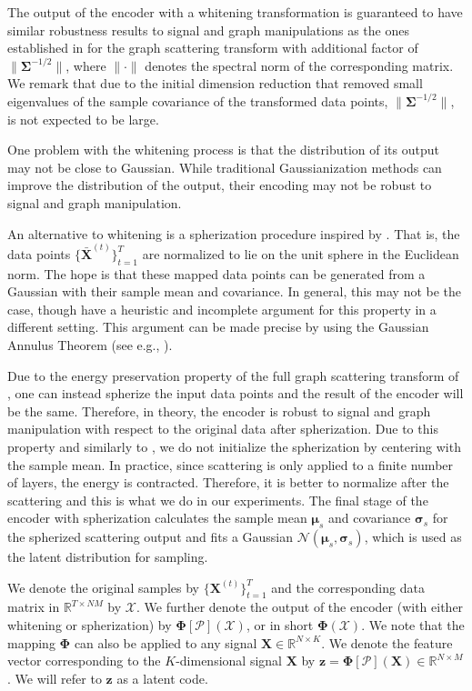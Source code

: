 \documentclass[conference]{IEEEtran}
\def\RR{\mathbb{R}}
\def\cN{\mathcal{N}}
\def\cP{\mathcal{P}}
\def\BX{\boldsymbol{X}}
\def\Bz{\boldsymbol{z}}
\def\BPhi{\boldsymbol{\Phi}}
\def\Bmu{\boldsymbol{\mu}}
\def\Bsigma{\boldsymbol{\sigma}}
\def\BSigma{\boldsymbol{\Sigma}}
\begin{document}
The output of the encoder with a whitening transformation is guaranteed to have similar robustness results to signal and graph manipulations as the ones established in \cite{zou2018graph} for the graph scattering transform with additional factor of $\|\BSigma^{-1/2}\|$, where $\|\cdot\|$ denotes the spectral norm of the corresponding matrix. We remark that due to the initial dimension reduction that removed small eigenvalues of the sample covariance of the transformed data points, $\|\BSigma^{-1/2}\|$, is not expected to be large.

One problem with the whitening process is that the distribution of its output may not be close to Gaussian. While traditional Gaussianization methods \cite{chen2001gaussianization, laparra2011iterative} can improve the distribution of the output, their encoding may not be robust to signal and graph manipulation.

An alternative to whitening is a spherization procedure inspired by \cite{bojanowski2018optimizing}.
That is, the data points $\{\bar{\BX}^{(t)} \}_{t=1}^T$ are normalized to lie on the unit sphere in the Euclidean norm. The hope is that these mapped data points can be generated from a Gaussian with their sample mean and covariance. In general, this may not be the case, though \cite{bojanowski2018optimizing} have a heuristic and incomplete argument for this property in a different setting. This argument {can be made precise by using} the Gaussian Annulus Theorem (see e.g., \cite[Theorem 2.9]{blum2017foundation}). 

Due to the energy preservation property of the full graph scattering transform of \cite{zou2018graph}, one can instead spherize the input data points and the result of the encoder will be the same. Therefore, in theory, the encoder is robust to signal and graph manipulation with respect to the original data after spherization. Due to this property and similarly to \cite{bojanowski2018optimizing}, we do not initialize the spherization by centering with the sample mean. In practice, since scattering is only applied to a finite number of layers, the energy is contracted. Therefore, it is better {to} normalize after the scattering and this is what we do in our experiments. The final stage of the encoder with spherization calculates the sample mean $\Bmu_s$ and covariance $\Bsigma_s$ for the spherized scattering output and fits a Gaussian $\cN(\Bmu_s, \Bsigma_s)$, which is used as the latent distribution for sampling.

We denote the original samples by $\{{\BX}^{(t)} \}_{t=1}^T$  and the corresponding data matrix in $\RR^{T \times NM}$  by ${\boldsymbol{\mathcal{X}}}$.
We further denote the output of the encoder (with either whitening or spherization) by $\BPhi [\cP] (\boldsymbol{\mathcal{X}})$, or in short $\BPhi(\boldsymbol{\mathcal{X}})$. We note that the mapping $\BPhi$ can also be applied to any signal $\BX \in \RR^{N \times K}$. We denote the feature vector corresponding to the $K$-dimensional signal $\BX$ by $\Bz  = \BPhi[\cP](\BX) \in \RR^{N \times M}$. We will refer to $\Bz$ as a latent code. 
\end{document}
